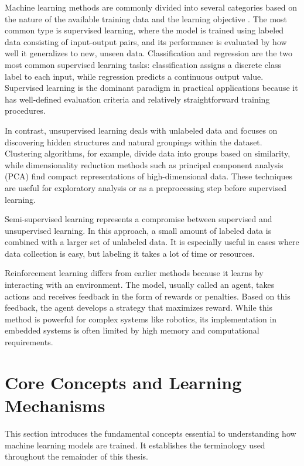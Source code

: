 Machine learning methods are commonly divided into several categories based on the nature of the available training data and the learning objective \cite{mitchell1997ml}. The most common type is supervised learning, where the model is trained using labeled data consisting of input-output pairs, and its performance is evaluated by how well it generalizes to new, unseen data. Classification and regression are the two most common supervised learning tasks: classification assigns a discrete class label to each input, while regression predicts a continuous output value. Supervised learning is the dominant paradigm in practical applications because it has well-defined evaluation criteria and relatively straightforward training procedures.

In contrast, unsupervised learning deals with unlabeled data and focuses on discovering hidden structures and natural groupings within the dataset. Clustering algorithms, for example, divide data into groups based on similarity, while dimensionality reduction methods such as principal component analysis (PCA) find compact representations of high-dimensional data. These techniques are useful for exploratory analysis or as a preprocessing step before supervised learning.

Semi-supervised learning represents a compromise between supervised and unsupervised learning. In this approach, a small amount of labeled data is combined with a larger set of unlabeled data. It is especially useful in cases where data collection is easy, but labeling it takes a lot of time or resources.

Reinforcement learning differs from earlier methods because it learns by interacting with an environment. The model, usually called an agent, takes actions and receives feedback in the form of rewards or penalties. Based on this feedback, the agent develops a strategy that maximizes reward. While this method is powerful for complex systems like robotics, its implementation in embedded systems is often limited by high memory and computational requirements.

\section{Core Concepts and Learning Mechanisms}
This section introduces the fundamental concepts essential to understanding how machine learning models are trained. It establishes the terminology used throughout the remainder of this thesis.

